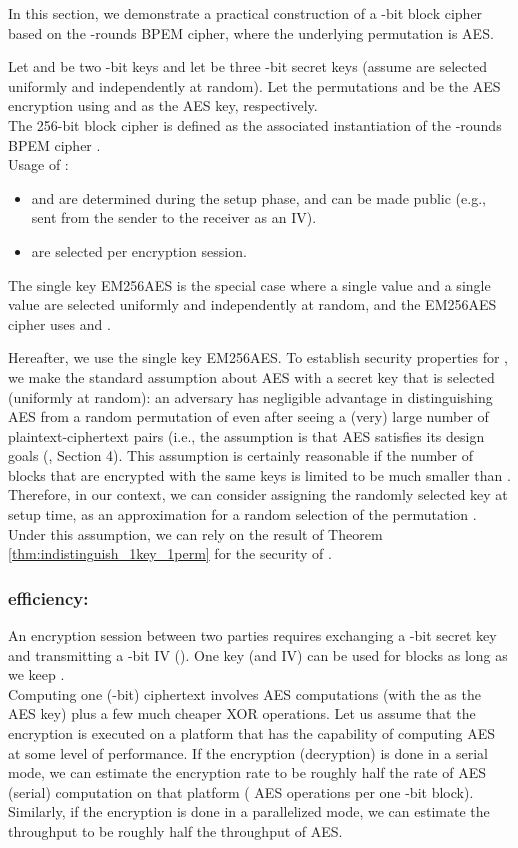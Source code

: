 \documentclass{llncs}
\begin{document}
In this section, we demonstrate a practical construction of a -bit block cipher based on the -rounds BPEM cipher, where the underlying permutation is AES.

\begin{definition}
Let  and  be two -bit keys and let  be three -bit secret keys (assume  are selected uniformly and independently at random). Let the permutations  and  be the AES encryption using  and  as the AES key, respectively. \\
The 256-bit block cipher  is defined as the associated instantiation of the -rounds BPEM cipher . \\
Usage of :

\begin{itemize}
\item []
 and  are determined during the setup phase, and can be made public (e.g., sent from the sender to the receiver as an IV).
\item []
 are selected per encryption session.
\end{itemize}
The single key EM256AES is the special case where a single value  and a single value  are selected uniformly and independently at random, and the EM256AES cipher uses  and .
\end{definition}

Hereafter, we use the single key EM256AES. To establish security properties for , we make the standard assumption about AES with a secret key that is selected (uniformly at random): an adversary has negligible advantage in distinguishing AES from a random permutation of  even after seeing a (very) large number of plaintext-ciphertext pairs (i.e., the assumption is that AES satisfies its design goals (\cite{NIST_request}, Section 4).
This assumption is certainly reasonable if the number of blocks that are encrypted with the same keys is limited to be much smaller than .
Therefore, in our context, we can consider assigning the randomly selected key  at setup time, as an approximation for a random selection of the permutation .
Under this assumption, we can rely on the result of Theorem \ref{thm:indistinguish_1key_1perm} for the security of .

\subsubsection{ efficiency:}
An encryption session between two parties requires exchanging a -bit secret key and transmitting a -bit IV (). One key (and IV) can be used for  blocks as long as we keep . \\
Computing one (-bit) ciphertext involves  AES computations (with the  as the AES key) plus a few much cheaper XOR operations. Let us assume that the encryption is executed on a platform that has the capability of computing AES at some level of performance. If the  encryption (decryption) is done in a serial mode, we can estimate the encryption rate to be roughly half the rate of AES (serial) computation on that platform ( AES operations per one -bit block). Similarly, if the  encryption is done in a parallelized mode, we can estimate the throughput to be roughly half the throughput of AES.
\end{document}
